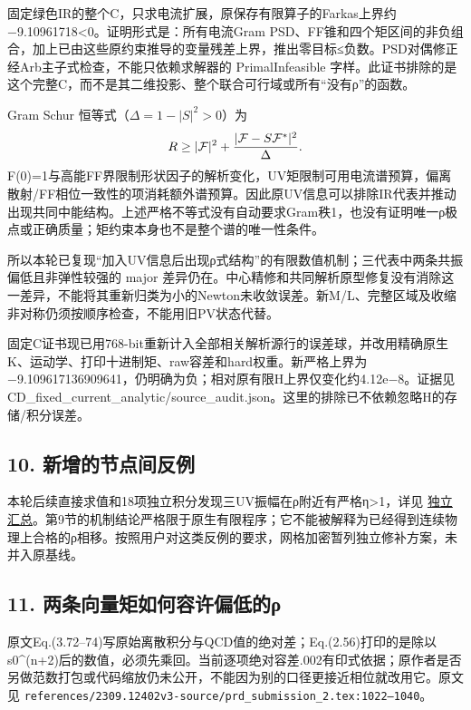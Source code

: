 \documentclass[
  11pt,
  a4paper,
]{article}
\begin{document}
固定绿色IR的整个C，只求电流扩展，原保存有限算子的Farkas上界约−9.10961718\textless0。证明形式是：所有电流Gram
PSD、FF锥和四个矩区间的非负组合，加上已由这些原约束推导的变量残差上界，推出零目标≤负数。PSD对偶修正经Arb主子式检查，不能只依赖求解器的
PrimalInfeasible
字样。此证书排除的是这个完整C，而不是其二维投影、整个联合可行域或所有``没有ρ''的函数。

Gram Schur 恒等式（\(\Delta=1-|S|^2>0\)）为 \[
R\ge |\mathcal F|^2+{|\mathcal F-S\mathcal F^*|^2\over\Delta}.
\]
F(0)=1与高能FF界限制形状因子的解析变化，UV矩限制可用电流谱预算，偏离散射/FF相位一致性的项消耗额外谱预算。因此原UV信息可以排除IR代表并推动出现共同中能结构。上述严格不等式没有自动要求Gram秩1，也没有证明唯一ρ极点或正确质量；矩约束本身也不是整个谱的唯一性条件。

所以本轮已复现``加入UV信息后出现ρ式结构''的有限数值机制；三代表中两条共振偏低且非弹性较强的
major
差异仍在。中心精修和共同解析原型修复没有消除这一差异，不能将其重新归类为小的Newton未收敛误差。新M/L、完整区域及收缩非对称仍须按顺序检查，不能用旧PV状态代替。

固定C证书现已用768-bit重新计入全部相关解析源行的误差球，并改用精确原生K、运动学、打印十进制矩、raw容差和hard权重。新严格上界为
−9.109617136909641，仍明确为负；相对原有限H上界仅变化约4.12e−8。证据见
CD\_fixed\_current\_analytic/source\_audit.json。这里的排除已不依赖忽略H的存储/积分误差。

\subsection{10.
新增的节点间反例}\label{ux65b0ux589eux7684ux8282ux70b9ux95f4ux53cdux4f8b}

本轮后续直接求值和18项独立积分发现三UV振幅在ρ附近有严格η\textgreater1，详见
\href{HELD_INTER_NODE_ISSUE_ZH.md}{独立汇总}。第9节的机制结论严格限于原生有限程序；它不能被解释为已经得到连续物理上合格的ρ相移。按照用户对这类反例的要求，网格加密暂列独立修补方案，未并入原基线。

\subsection{11.
两条向量矩如何容许偏低的ρ}\label{ux4e24ux6761ux5411ux91cfux77e9ux5982ux4f55ux5bb9ux8bb8ux504fux4f4eux7684ux3c1}

原文Eq.(3.72--74)写原始离散积分与QCD值的绝对差；Eq.(2.56)打印的是除以s0\^{}(n+2)后的数值，必须先乘回。当前逐项绝对容差.002有印式依据；原作者是否另做范数打包或代码缩放仍未公开，不能因为别的口径更接近相位就改用它。原文见
\texttt{references/2309.12402v3-source/prd\_submission\_2.tex:1022–1040}。
\end{document}
